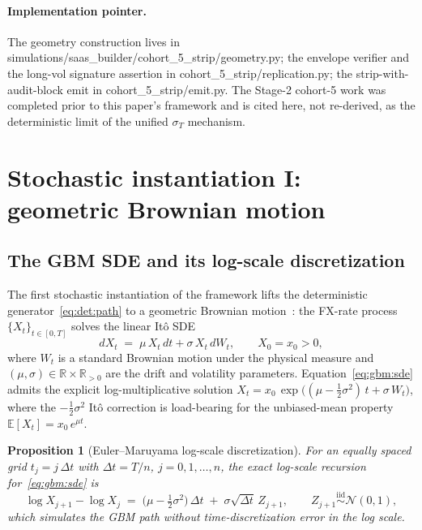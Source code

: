 \documentclass[11pt,letterpaper]{article}
\newtheorem{proposition}{Proposition}[section]
\newcommand{\E}{\mathbb{E}}
\newcommand{\R}{\mathbb{R}}
\newcommand{\sigmaT}{\sigma_{T}}
\begin{document}
\paragraph{Implementation pointer.}
The geometry construction lives in
\textsf{simulations/saas\_builder/cohort\_5\_strip/geometry.py}; the
envelope verifier and the long-vol signature assertion in
\textsf{cohort\_5\_strip/replication.py}; the strip-with-audit-block emit
in \textsf{cohort\_5\_strip/emit.py}. The Stage-2 cohort-5 work was
completed prior to this paper's framework and is cited here, not
re-derived, as the deterministic limit of the unified $\sigmaT$ mechanism.

\section{Stochastic instantiation I: geometric Brownian motion}
\label{sec:gbm}

\subsection{The GBM SDE and its log-scale discretization}
\label{sec:gbm:sde}

The first stochastic instantiation of the framework lifts the
deterministic generator~\eqref{eq:det:path} to a geometric Brownian
motion~\cite{hull-2017}: the FX-rate process $\{X_t\}_{t \in [0,T]}$
solves the linear Itô SDE
\begin{equation}
    dX_{t} \;=\; \mu\,X_{t}\,dt + \sigma\,X_{t}\,dW_{t},
    \qquad X_{0} = x_{0} > 0,
    \label{eq:gbm:sde}
\end{equation}
where $W_{t}$ is a standard Brownian motion under the physical measure
and $(\mu, \sigma) \in \R \times \R_{>0}$ are the drift and volatility
parameters. Equation~\eqref{eq:gbm:sde} admits the explicit
log-multiplicative solution
$X_{t} = x_{0}\,\exp\bigl((\mu - \tfrac{1}{2}\sigma^{2})\,t + \sigma\,W_{t}\bigr)$,
where the $-\tfrac{1}{2}\sigma^{2}$ Itô correction is load-bearing for
the unbiased-mean property $\E[X_{t}] = x_{0}\,e^{\mu t}$.

\begin{proposition}[Euler--Maruyama log-scale discretization]
\label{prop:gbm:disc}
For an equally spaced grid $t_{j} = j\,\Delta t$ with $\Delta t = T/n$,
$j = 0, 1, \dots, n$, the exact log-scale recursion for~\eqref{eq:gbm:sde}
is
\begin{equation}
    \log X_{j+1} - \log X_{j}
    \;=\;
    \bigl(\mu - \tfrac{1}{2}\sigma^{2}\bigr)\,\Delta t
    \;+\; \sigma\sqrt{\Delta t}\,Z_{j+1},
    \qquad Z_{j+1} \stackrel{\text{iid}}{\sim} \mathcal{N}(0, 1),
    \label{eq:gbm:euler}
\end{equation}
which simulates the GBM path without time-discretization error in the
log scale.
\end{proposition}
\end{document}
